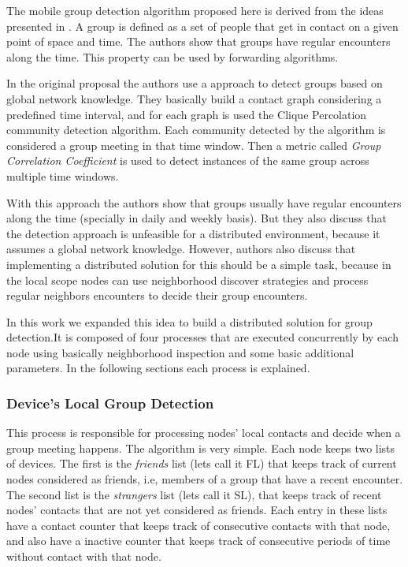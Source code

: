 The mobile group detection algorithm proposed here is derived from the ideas presented in \citealt{Nune1605:Group}.
A group is defined as a set of people that get in contact on a given point of space and time. The authors show that
groups have regular encounters along the time. This property can be used by forwarding algorithms. 

In the original proposal the authors use a approach to detect groups based on global network knowledge. They basically
build a contact graph considering a predefined time interval, and for each graph is used the Clique Percolation community
detection algorithm. Each community detected by the algorithm is considered a group meeting in that time window. Then
a metric called \textit{Group Correlation Coefficient} is used to detect instances of the same group across multiple time
windows.

With this approach the authors show that groups usually have regular encounters along the time (specially in daily and weekly basis).
But they also discuss that the detection approach is unfeasible for a distributed environment, because it assumes a global network
knowledge. However, authors also discuss that implementing a distributed solution for this should be a simple task, because in the local
scope nodes can use neighborhood discover strategies and process regular neighbors encounters to decide their group encounters.

In this work we expanded this idea to build a distributed solution for group detection.It is composed of four processes
that are executed concurrently by each node using basically neighborhood inspection and some basic additional parameters. In the following sections each process is explained.

\subsubsection{Device's Local Group Detection}

This process is responsible for processing nodes' local contacts and decide when a group meeting happens.
The algorithm is very simple. Each node keeps two lists of devices. The first is the \textit{friends} list (lets call it FL) 
that keeps track of current nodes considered as friends, i.e, members of a group that have a recent encounter.
The second list is the \textit{strangers} list (lets call it SL), that keeps track of recent nodes' contacts that are not yet 
considered as friends. Each entry in these lists have a contact counter that keeps track of consecutive
contacts with that node, and also have a inactive counter that keeps track of consecutive periods of time
without contact with that node.

